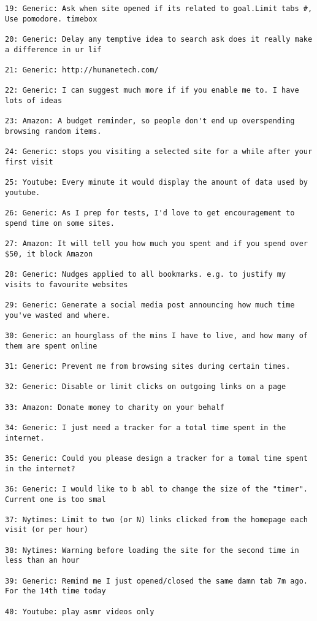 \begin{lstlisting}[breaklines]
19: Generic: Ask when site opened if its related to goal.Limit tabs #, Use pomodore. timebox

20: Generic: Delay any temptive idea to search ask does it really make a difference in ur lif

21: Generic: http://humanetech.com/

22: Generic: I can suggest much more if if you enable me to. I have lots of ideas

23: Amazon: A budget reminder, so people don't end up overspending browsing random items.

24: Generic: stops you visiting a selected site for a while after your first visit

25: Youtube: Every minute it would display the amount of data used by youtube.

26: Generic: As I prep for tests, I'd love to get encouragement to spend time on some sites.

27: Amazon: It will tell you how much you spent and if you spend over $50, it block Amazon

28: Generic: Nudges applied to all bookmarks. e.g. to justify my visits to favourite websites

29: Generic: Generate a social media post announcing how much time you've wasted and where.

30: Generic: an hourglass of the mins I have to live, and how many of them are spent online

31: Generic: Prevent me from browsing sites during certain times.

32: Generic: Disable or limit clicks on outgoing links on a page

33: Amazon: Donate money to charity on your behalf

34: Generic: I just need a tracker for a total time spent in the internet.

35: Generic: Could you please design a tracker for a tomal time spent in the internet?

36: Generic: I would like to b abl to change the size of the "timer". Current one is too smal

37: Nytimes: Limit to two (or N) links clicked from the homepage each visit (or per hour)

38: Nytimes: Warning before loading the site for the second time in less than an hour

39: Generic: Remind me I just opened/closed the same damn tab 7m ago. For the 14th time today

40: Youtube: play asmr videos only


\end{lstlisting}
